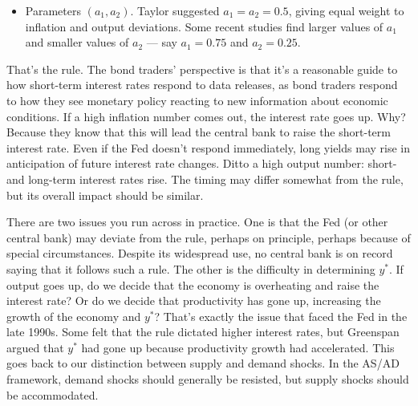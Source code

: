 \documentclass[letterpaper,12pt]{article}
\begin{document}
\begin{itemize}
\item Parameters $(a_1,a_2)$.
Taylor suggested $a_1 = a_2 = 0.5$,
giving equal weight to inflation and output deviations.
Some recent studies find larger values of $a_1$
and smaller values of $a_2$ --- say
$a_1 = 0.75$ and $a_2 = 0.25$.
\end{itemize}

That's the rule.
The bond traders' perspective is that it's a reasonable guide to how
short-term interest rates respond to data releases,
as bond traders respond to how they see monetary policy reacting
to new information about economic conditions.
If a high inflation number comes out, the interest rate goes up.
Why?  Because they know that this will lead the central bank to raise
the short-term interest rate.
Even if the Fed doesn't respond immediately,
long yields may rise in anticipation of future interest rate changes.
Ditto a high output number:
short- and long-term interest rates rise.
The timing may differ somewhat from the rule,
but its overall impact should be similar.


There are two issues you run across in practice.
One is that the Fed (or other central bank) may deviate from
the rule, perhaps on principle, perhaps because of special circumstances.
Despite its widespread use, no central bank is on record
saying that it follows such a rule.
The other is the difficulty in determining $y^*$.
If output goes up, do we decide that the economy is overheating
and raise the interest rate?
Or do we decide that productivity has gone up,
increasing the growth of the economy and $y^*$?
That's exactly the issue that faced the Fed in the late 1990s.
Some felt that the rule dictated higher interest rates,
but Greenspan argued that $y^*$ had gone up because
productivity growth had accelerated.
This goes back to our distinction between
supply and demand shocks.
In the AS/AD framework,
demand shocks should generally be resisted,
but supply shocks should be accommodated.
\end{document}
